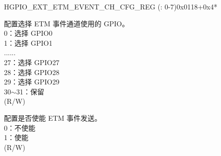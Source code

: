 \begin{register}{H}{GPIO\_EXT\_ETM\_EVENT\_CH\_CFG\_REG (: 0-7)}{0x0118+0x4*}\label{regdesc:GPIOEXTETMEVENTCHNCFGREG}
%
%
%
%
\regnewline%
\begin{regdesc}\begin{reglist}
\label{fielddesc:GPIOEXTETMCHNEVENTSEL}\item [GPIO\_EXT\_ETM\_CH\regindex{n}\_EVENT\_SEL] 配置选择 ETM 事件通道使用的 GPIO。\\
0：选择 GPIO0\\
1：选择 GPIO1\\
......\\
27：选择 GPIO27\\
28：选择 GPIO28\\ 
29：选择 GPIO29\\ 
30$\sim$31：保留\\ (R/W)
\label{fielddesc:GPIOEXTETMCHNEVENTEN}\item [GPIO\_EXT\_ETM\_CH\regindex{n}\_EVENT\_EN] 配置是否使能 ETM 事件发送。\\
0：不使能 \\
1：使能\\ (R/W)
\end{reglist}\end{regdesc}
\end{register}


